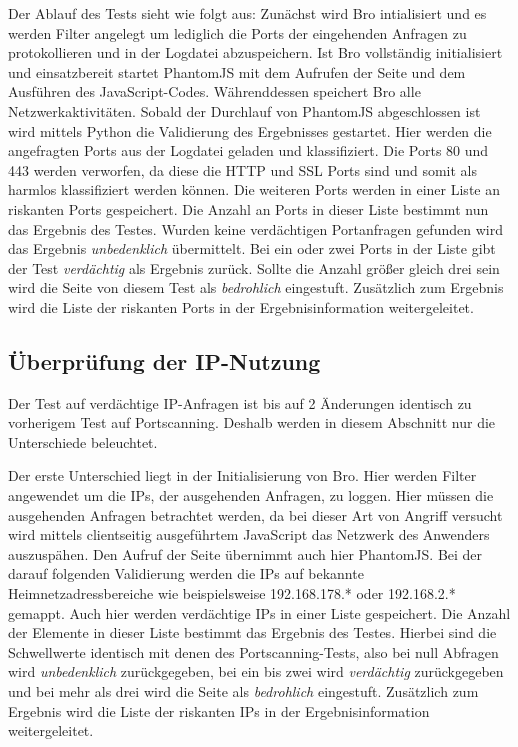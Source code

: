 Der Ablauf des Tests sieht wie folgt aus: Zunächst wird Bro intialisiert und es werden Filter
angelegt um lediglich die Ports der eingehenden Anfragen zu protokollieren und in der Logdatei
abzuspeichern. Ist Bro vollständig initialisiert und einsatzbereit startet PhantomJS mit dem
Aufrufen der Seite und dem Ausführen des JavaScript-Codes. Währenddessen speichert Bro alle
Netzwerkaktivitäten. Sobald der Durchlauf von PhantomJS abgeschlossen ist wird mittels Python die
Validierung des Ergebnisses gestartet. Hier werden die angefragten Ports aus der Logdatei geladen
und klassifiziert. Die Ports 80 und 443 werden verworfen, da diese die \acs{HTTP} und \acs{SSL}
Ports sind und somit als harmlos klassifiziert werden können. Die weiteren Ports werden in einer
Liste an riskanten Ports gespeichert. Die Anzahl an Ports in dieser Liste bestimmt nun das Ergebnis
des Testes. Wurden keine verdächtigen Portanfragen gefunden wird das Ergebnis \textit{unbedenklich}
übermittelt. Bei ein oder zwei Ports in der Liste gibt der Test \textit{verdächtig} als Ergebnis
zurück.
Sollte die Anzahl größer gleich drei sein wird die Seite von diesem Test als \textit{bedrohlich}
eingestuft. Zusätzlich zum Ergebnis wird die Liste der riskanten Ports in der Ergebnisinformation
weitergeleitet.

\subsection{Überprüfung der IP-Nutzung}
Der Test auf verdächtige IP-Anfragen ist bis auf 2 Änderungen identisch zu vorherigem Test auf
Portscanning. Deshalb werden in diesem Abschnitt nur die Unterschiede beleuchtet.

Der erste Unterschied liegt in der Initialisierung von Bro. Hier werden Filter angewendet um die
IPs, der ausgehenden Anfragen, zu loggen. Hier müssen die ausgehenden Anfragen betrachtet werden,
da bei dieser Art von Angriff versucht wird mittels clientseitig ausgeführtem JavaScript das
Netzwerk des Anwenders auszuspähen. Den Aufruf der Seite übernimmt auch hier PhantomJS. Bei der
darauf folgenden Validierung werden die IPs auf bekannte Heimnetzadressbereiche wie beispielsweise
192.168.178.* oder 192.168.2.* gemappt. Auch hier werden verdächtige IPs in einer Liste
gespeichert. Die Anzahl der Elemente in dieser Liste bestimmt das Ergebnis des Testes. Hierbei sind
die Schwellwerte identisch mit denen des Portscanning-Tests, also bei null Abfragen wird
\textit{unbedenklich} zurückgegeben, bei ein bis zwei wird \textit{verdächtig} zurückgegeben und bei
mehr als drei wird die Seite als \textit{bedrohlich} eingestuft. Zusätzlich zum Ergebnis wird die
Liste der riskanten IPs in der Ergebnisinformation weitergeleitet.


